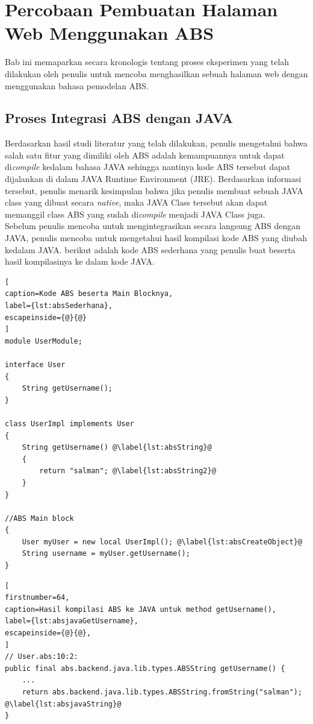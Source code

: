 \chapter{Percobaan Pembuatan Halaman Web Menggunakan ABS}

Bab ini memaparkan secara kronologis tentang proses eksperimen yang telah dilakukan oleh penulis untuk mencoba menghasilkan sebuah halaman web dengan menggunakan bahasa pemodelan ABS.

\section{Proses Integrasi ABS dengan JAVA}
Berdasarkan hasil studi literatur yang telah dilakukan, penulis mengetahui bahwa salah satu fitur yang dimiliki oleh ABS adalah kemampuannya untuk dapat di\textit{compile} kedalam bahasa JAVA sehingga nantinya kode ABS tersebut dapat dijalankan di dalam JAVA Runtime Environment (JRE). Berdasarkan informasi tersebut, penulis menarik kesimpulan bahwa jika penulis membuat sebuah JAVA class yang dibuat secara \textit{native}, maka JAVA Class tersebut akan dapat memanggil class ABS yang sudah di\textit{compile} menjadi JAVA Class juga.\\

Sebelum penulis mencoba untuk mengintegrasikan secara langsung ABS dengan JAVA, penulis mencoba untuk mengetahui hasil kompilasi kode ABS yang diubah kedalam JAVA. berikut adalah kode ABS sederhana yang penulis buat beserta hasil kompilasinya ke dalam kode JAVA.

\begin{lstlisting}[
caption=Kode ABS beserta Main Blocknya,
label={lst:absSederhana},
escapeinside={@}{@}
]
module UserModule;

interface User
{
	String getUsername();
}

class UserImpl implements User
{
	String getUsername() @\label{lst:absString}@
	{
		return "salman"; @\label{lst:absString2}@
	}
}

//ABS Main block
{
	User myUser = new local UserImpl(); @\label{lst:absCreateObject}@
	String username = myUser.getUsername();
}
\end{lstlisting}

\begin{lstlisting}[ 
firstnumber=64,
caption=Hasil kompilasi ABS ke JAVA untuk method getUsername(),
label={lst:absjavaGetUsername},
escapeinside={@}{@},
]
// User.abs:10:2: 
public final abs.backend.java.lib.types.ABSString getUsername() {
    ...
    return abs.backend.java.lib.types.ABSString.fromString("salman"); @\label{lst:absjavaString}@
}
\end{lstlisting}

